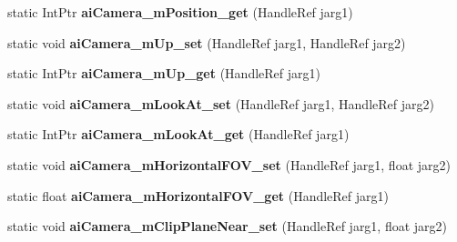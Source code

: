 \begin{DoxyCompactItemize}
\item 
\hypertarget{class_assimp_p_i_n_v_o_k_e_ab1cfbc21515b61ee6be665f9fafa1183}{static Int\+Ptr {\bfseries ai\+Camera\+\_\+m\+Position\+\_\+get} (Handle\+Ref jarg1)}\label{class_assimp_p_i_n_v_o_k_e_ab1cfbc21515b61ee6be665f9fafa1183}

\item 
\hypertarget{class_assimp_p_i_n_v_o_k_e_a77311c02d49ac0f9d97425b6efe9e426}{static void {\bfseries ai\+Camera\+\_\+m\+Up\+\_\+set} (Handle\+Ref jarg1, Handle\+Ref jarg2)}\label{class_assimp_p_i_n_v_o_k_e_a77311c02d49ac0f9d97425b6efe9e426}

\item 
\hypertarget{class_assimp_p_i_n_v_o_k_e_a41604a33ad6185d8aa5405ecaa964767}{static Int\+Ptr {\bfseries ai\+Camera\+\_\+m\+Up\+\_\+get} (Handle\+Ref jarg1)}\label{class_assimp_p_i_n_v_o_k_e_a41604a33ad6185d8aa5405ecaa964767}

\item 
\hypertarget{class_assimp_p_i_n_v_o_k_e_aae474180c48902211b86df2458262e1d}{static void {\bfseries ai\+Camera\+\_\+m\+Look\+At\+\_\+set} (Handle\+Ref jarg1, Handle\+Ref jarg2)}\label{class_assimp_p_i_n_v_o_k_e_aae474180c48902211b86df2458262e1d}

\item 
\hypertarget{class_assimp_p_i_n_v_o_k_e_ae458a5c7b2b54a6cd26c3315c9b2f915}{static Int\+Ptr {\bfseries ai\+Camera\+\_\+m\+Look\+At\+\_\+get} (Handle\+Ref jarg1)}\label{class_assimp_p_i_n_v_o_k_e_ae458a5c7b2b54a6cd26c3315c9b2f915}

\item 
\hypertarget{class_assimp_p_i_n_v_o_k_e_a3c672c40ba22ac60cb2db0a296af5537}{static void {\bfseries ai\+Camera\+\_\+m\+Horizontal\+F\+O\+V\+\_\+set} (Handle\+Ref jarg1, float jarg2)}\label{class_assimp_p_i_n_v_o_k_e_a3c672c40ba22ac60cb2db0a296af5537}

\item 
\hypertarget{class_assimp_p_i_n_v_o_k_e_a50215e5981e6a276df3808effb8fb177}{static float {\bfseries ai\+Camera\+\_\+m\+Horizontal\+F\+O\+V\+\_\+get} (Handle\+Ref jarg1)}\label{class_assimp_p_i_n_v_o_k_e_a50215e5981e6a276df3808effb8fb177}

\item 
\hypertarget{class_assimp_p_i_n_v_o_k_e_a05c14e098b5d01509a7a1192ab2ccdbe}{static void {\bfseries ai\+Camera\+\_\+m\+Clip\+Plane\+Near\+\_\+set} (Handle\+Ref jarg1, float jarg2)}\label{class_assimp_p_i_n_v_o_k_e_a05c14e098b5d01509a7a1192ab2ccdbe}


\end{DoxyCompactItemize}
